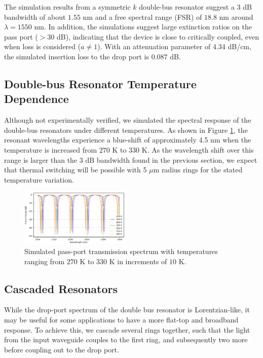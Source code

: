 \documentclass[letterpaper, 10 pt, conference]{ieeeconf}
\begin{document}
The simulation results from a symmetric $k$ double-bus resonator suggest a 3 dB bandwidth of about $1.55$ nm and a free spectral range (FSR) of $18.8$ nm around $ \lambda = 1550$ nm. In addition, the simulations suggest large extinction ratios on the pass port ($>30$ dB), indicating that the device is close to critically coupled, even when loss is considered ($a\not =1$). With an attenuation parameter of 4.34 dB/cm, the simulated insertion loss to the drop port is $0.087$ dB.

\subsection*{Double-bus Resonator Temperature Dependence} 
Although not experimentally verified, we simulated the spectral response of the double-bus resonators under different temperatures. As shown in Figure \ref{fig:temp}, the resonant wavelengths experience a blue-shift of approximately 4.5 nm when the temperature is increased from $270$ K to $330$ K. As the wavelength shift over this range is larger than the 3 dB bandwidth found in the previous section, we expect that thermal switching will be possible with 5 $\mu$m radius rings for the stated temperature variation.

\begin{figure}[!ht]
    \centering
    \includegraphics[width = 0.47\textwidth]{Temp_dependence.png}
    \caption{Simulated pass-port transmission spectrum with temperatures ranging from $270$ K to $330$ K in increments of $10$ K.}
    \label{fig:temp}
\end{figure} 

\subsection*{Cascaded Resonators}

While the drop-port spectrum of the double bus resonator is Lorentzian-like, it may be useful for some applications to have a more flat-top and broadband response. To achieve this, we cascade several rings together, such that the light from the input waveguide couples to the first ring, and subsequently two more before coupling out to the drop port. 
\end{document}
